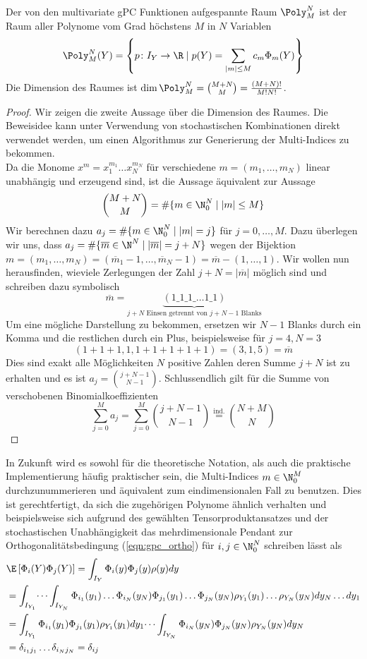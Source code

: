\begin{mathbem}
Der von den multivariate gPC Funktionen aufgespannte Raum $\Poly_M^N$ ist der Raum aller Polynome vom Grad höchstens $M$ in $N$ Variablen
\[\Poly_M^N(Y)=\left\lbrace p\colon I_Y\to \R \mid p(Y)=\sum_{|m|\le M}c_m\Phi_m(Y)\right\rbrace\]
Die Dimension des Raumes ist $\dim\Poly_M^N=\binom{M+N}{M}=\frac{(M+N)!}{M!N!}$.
\end{mathbem}
\begin{proof}
Wir zeigen die zweite Aussage über die Dimension des Raumes. Die Beweisidee kann unter Verwendung von stochastischen Kombinationen direkt verwendet werden, um einen Algorithmus zur Generierung der Multi-Indices zu bekommen.\\
Da die Monome $x^m=x_1^{m_1}\dots x_N^{m_N}$ für verschiedene $m=(m_1,\dots,m_N)$ linear unabhängig und erzeugend sind, ist die Aussage äquivalent zur Aussage
\[\binom{M+N}{M}=\#\lbrace m\in\N_0^N \mid |m|\le M\rbrace\] 
Wir berechnen dazu $a_j=\#\lbrace m\in\N_0^N \mid |m|=j\rbrace$ für $j=0,\dots,M$. Dazu überlegen wir uns, dass $a_j=\#\lbrace \overline{m}\in\N^N \mid |\overline{m}|=j+N\rbrace$ wegen der Bijektion $m=(m_1,\dots,m_N)=(\overline{m}_1-1,\dots,\overline{m}_N-1)=\overline{m}-(1,\dots,1)$. Wir wollen nun herausfinden, wieviele Zerlegungen der Zahl $j+N=|\overline{m}|$ möglich sind und schreiben dazu symbolisch
\[\overline{m}=\underbrace{(1\_1\_1\_\dots 1\_1)}_{j+N\text{ Einsen getrennt von } j+N-1 \text{ Blanks}}\]
Um eine mögliche Darstellung zu bekommen, ersetzen wir $N-1$ Blanks durch ein Komma und die restlichen durch ein Plus, beispielsweise für $j=4,N=3$
\[(1+1+1,1,1+1+1+1+1)=(3,1,5)=\overline{m}\]
Dies sind exakt alle Möglichkeiten $N$ positive Zahlen deren Summe $j+N$ ist zu erhalten und es ist $a_j=\binom{j+N-1}{N-1}$.
Schlussendlich gilt für die Summe von verschobenen Binomialkoeffizienten 
\[\sum_{j=0}^Ma_j=\sum_{j=0}^M\binom{j+N-1}{N-1}\stackrel{\text{ind.}}{=}\binom{N+M}{N}\]
\end{proof}
In Zukunft wird es sowohl für die theoretische Notation, als auch die praktische Implementierung häufig praktischer sein, die Multi-Indices $m\in\N_0^M$ durchzunummerieren und äquivalent zum eindimensionalen Fall zu benutzen. Dies ist gerechtfertigt, da sich die zugehörigen Polynome ähnlich verhalten und beispielsweise sich aufgrund des gewählten Tensorproduktansatzes und der stochastischen Unabhängigkeit das mehrdimensionale Pendant zur Orthogonalitätsbedingung (\ref{eqn:gpc_ortho}) für $i,j\in\N_0^N$ schreiben lässt als
\begin{align*}
&\E\left[\Phi_i(Y)\Phi_j(Y)\right]=\int_{I_Y} \Phi_i(y)\Phi_j(y)\rho(y)dy\\
&=\int_{I_{Y_1}}\dots\int_{I_{Y_N}}\Phi_{i_1}(y_1)\dots\Phi_{i_N}(y_N)\Phi_{j_1}(y_1)\dots\Phi_{j_N}(y_N)\rho_{Y_1}(y_1)\dots\rho_{Y_N}(y_N)dy_N\dots dy_1\\
&=\int_{I_{Y_1}}\Phi_{i_1}(y_1)\Phi_{j_1}(y_1)\rho_{Y_1}(y_1)dy_1\dots\int_{I_{Y_N}}\Phi_{i_N}(y_N)\Phi_{j_N}(y_N)\rho_{Y_N}(y_N)dy_N\\
&=\delta_{i_1j_1}\dots \delta_{i_Nj_N}=\delta_{ij}
\end{align*}
